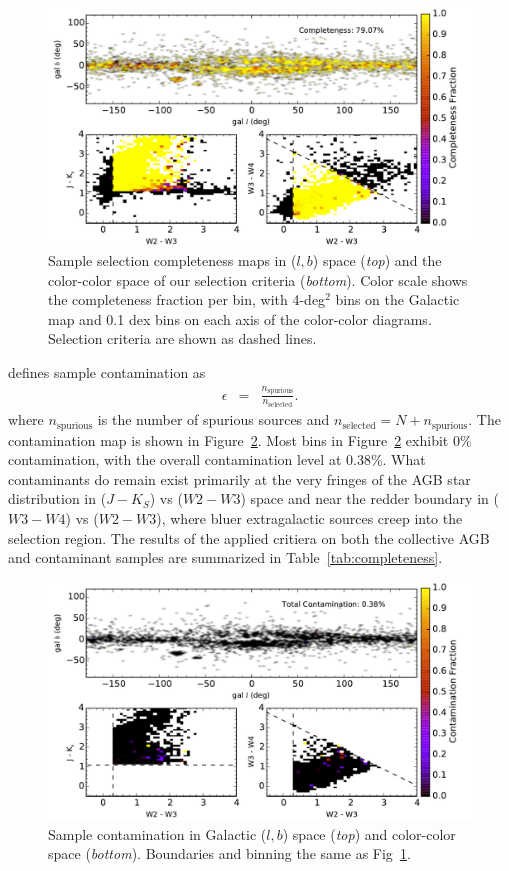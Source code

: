 \begin{figure}[h]
\includegraphics[width=6.7in]{figs/completeness_map.pdf}
\caption{Sample selection completeness maps in ($l,b$) space (\emph{top}) and the color-color space of our selection criteria (\emph{bottom}). Color scale shows the completeness fraction per bin, with 4-deg$^2$ bins on the Galactic map and 0.1 dex bins on each axis of the color-color diagrams. Selection criteria are shown as dashed lines.\label{fig:completeness}}
\end{figure}

\cite{2013sdmm.book.....I} defines sample contamination as
\begin{eqnarray*}
\epsilon &=& \frac{n_\text{spurious}}{n_\text{selected}}.
\end{eqnarray*}
where $n_\text{spurious}$ is the number of spurious sources and $n_\text{selected} = N + n_\text{spurious}$. The contamination map is shown in Figure~\ref{fig:contamination}. Most bins in Figure~\ref{fig:contamination} exhibit 0\% contamination, with the overall contamination level at 0.38\%. What contaminants do remain exist primarily at the very fringes of the AGB star distribution in ($J-K_S$) vs ($W2 - W3$) space and near the redder boundary in ($W3-W4$) vs ($W2 - W3$), where bluer extragalactic sources creep into the selection region. The results of the applied critiera on both the collective AGB and contaminant samples are summarized in Table~\ref{tab:completeness}.

\begin{figure}[h]
\includegraphics[width=6.7in]{figs/contamination_map.pdf}
\caption{Sample contamination in Galactic ($l,b$) space (\emph{top}) and color-color space (\emph{bottom}). Boundaries and binning the same as Fig~\ref{fig:completeness}.\label{fig:contamination}}
\end{figure}

